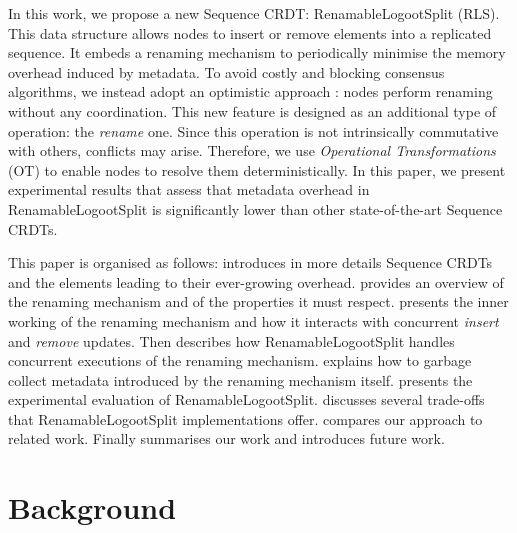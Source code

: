 \documentclass[10pt,journal,compsoc]{IEEEtran}
\begin{document}
In this work, we propose a new Sequence \ac{CRDT}: RenamableLogootSplit (RLS).
This data structure allows nodes to insert or remove elements into a replicated sequence.
It embeds a renaming mechanism to periodically minimise the memory overhead induced by metadata.
To avoid costly and blocking consensus algorithms, we instead adopt an optimistic approach : nodes perform renaming without any coordination.
This new feature is designed as an additional type of operation: the \emph{rename} one.
Since this operation is not intrinsically commutative with others, conflicts may arise.
Therefore, we use \emph{Operational Transformations} (OT) \cite{10.1145/67544.66963,10.1145/289444.289469,4668339} to enable nodes to resolve them deterministically.
In this paper, we present experimental results that assess that metadata overhead in RenamableLogootSplit is significantly lower than other state-of-the-art Sequence \acp{CRDT}.

This paper is organised as follows:
 introduces in more details Sequence \acp{CRDT} and the elements leading to their ever-growing overhead.
 provides an overview of the renaming mechanism and of the properties it must respect.
 presents the inner working of the renaming mechanism and how it interacts with concurrent \emph{insert} and \emph{remove} updates.
Then  describes how RenamableLogootSplit handles concurrent executions of the renaming mechanism.
 explains how to garbage collect metadata introduced by the renaming mechanism itself.
 presents the experimental evaluation of RenamableLogootSplit.
 discusses several trade-offs that RenamableLogootSplit implementations offer.
 compares our approach to related work.
Finally  summarises our work and introduces future work.


\section{Background}
\label{sec:background}
\end{document}
